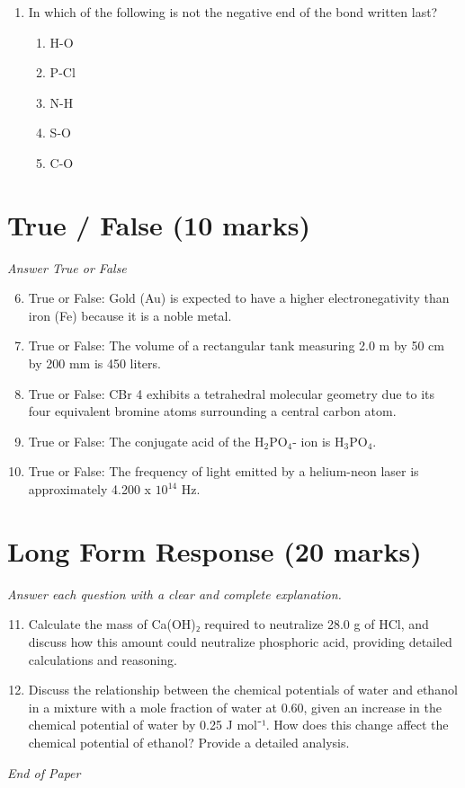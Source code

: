 \documentclass[12pt]{article}
\begin{document}
\begin{enumerate}[label=\arabic*.]
\begin{enumerate}[label=(\alph*)]
    \item All atoms of calcium have 20 protons and 40 neutrons
    \item It contains 20 protons, neutrons, and electrons
    \item All calcium atoms have 20 protons, neutrons, and electrons
    \item All atoms of calcium have a mass of 40.078 u
\end{enumerate}
\item In which of the following is not the negative end of the bond written last?
\begin{enumerate}[label=(\alph*)]
    \item H-O
    \item P-Cl
    \item N-H
    \item S-O
    \item C-O
\end{enumerate}
\end{enumerate}

\section*{True / False (10 marks)}
\textit{Answer True or False}
\begin{enumerate}[label=\arabic*.]
\setcounter{enumi}{5}
\item True or False: Gold (Au) is expected to have a higher electronegativity than iron (Fe) because it is a noble metal.
\item True or False: The volume of a rectangular tank measuring 2.0 m by 50 cm by 200 mm is 450 liters.
\item True or False: CBr 4 exhibits a tetrahedral molecular geometry due to its four equivalent bromine atoms surrounding a central carbon atom.
\item True or False: The conjugate acid of the H$_{2}$PO$_{4}$- ion is H$_{3}$PO$_{4}$.
\item True or False: The frequency of light emitted by a helium-neon laser is approximately 4.200 x $10^14$ Hz.
\end{enumerate}

\section*{Long Form Response (20 marks)}
\textit{Answer each question with a clear and complete explanation.}
\begin{enumerate}[label=\arabic*.]
\setcounter{enumi}{10}
\item Calculate the mass of Ca(OH)₂ required to neutralize 28.0 g of HCl, and discuss how this amount could neutralize phosphoric acid, providing detailed calculations and reasoning.
\item Discuss the relationship between the chemical potentials of water and ethanol in a mixture with a mole fraction of water at 0.60, given an increase in the chemical potential of water by 0.25 J mol⁻¹. How does this change affect the chemical potential of ethanol? Provide a detailed analysis.
\end{enumerate}

\vfill
\noindent\textit{End of Paper}
\end{document}
